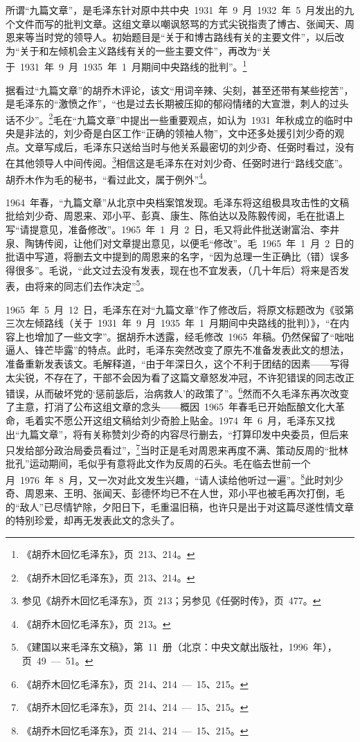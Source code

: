 所谓“九篇文章”，是毛泽东针对原中共中央~1931~年~9~月~1932~年~5~月发出的九个文件而写的批判文章。这组文章以嘲讽怒骂的方式尖锐指责了博古、张闻天、周恩来等当时党的领导人。初始题目是“关于和博古路线有关的主要文件”，以后改为“关于和左倾机会主义路线有关的一些主要文件”，再改为“关于~1931~年~9~月~1935~年~1~月期间中央路线的批判”。\footnote{《胡乔木回忆毛泽东》，页~213、214。}

据看过“九篇文章”的胡乔木评论，该文“用词辛辣、尖刻，甚至还带有某些挖苦”，是毛泽东的“激愤之作”，“也是过去长期被压抑的郁闷情绪的大宣泄，刺人的过头话不少”。\footnote{《胡乔木回忆毛泽东》，页~213、214。}毛在“九篇文章”中提出一些重要观点，如认为~1931~年秋成立的临时中央是非法的，刘少奇是白区工作“正确的领袖人物”，文中还多处援引刘少奇的观点。文章写成后，毛泽东只送给当时与他关系最密切的刘少奇、任弼时看过，没有在其他领导人中间传阅。\footnote{参见《胡乔木回忆毛泽东》，页~213；另参见《任弼时传》，页~477。}相信这是毛泽东在对刘少奇、任弼时进行“路线交底”。胡乔木作为毛的秘书，“看过此文，属于例外”\footnote{《胡乔木回忆毛泽东》，页~213。}。

1964~年春，“九篇文章”从北京中央档案馆发现。毛泽东将这组极具攻击性的文稿批给刘少奇、周恩来、邓小平、彭真、康生、陈伯达以及陈毅传阅，毛在批语上写“请提意见，准备修改”。1965~年~1~月~2~日，毛又将此件批送谢富治、李井泉、陶铸传阅，让他们对文章提出意见，以便毛“修改”。毛~1965~年~1~月~2~日的批语中写道，将删去文中提到的周恩来的名字，“因为总理一生正确比（错）误多得很多”。毛说，“此文过去没有发表，现在也不宜发表，（几十年后）将来是否发表，由将来的同志们去作决定”\footnote{《建国以来毛泽东文稿》，第~11~册（北京：中央文献出版社，1996~年），页~49~—~51。}。

1965~年~5~月~12~日，毛泽东在对“九篇文章”作了修改后，将原文标题改为《驳第三次左倾路线（关于~1931~年~9~月~1935~年~1~月期间中央路线的批判）》，“在内容上也增加了一些文字”。据胡乔木透露，经毛修改~1965~年稿。仍然保留了“咄咄逼人、锋芒毕露”的特点。此时，毛泽东突然改变了原先不准备发表此文的想法，准备重新发表该文。毛解释道，“由于年深日久，这个不利于团结的因素——写得太尖锐，不存在了，干部不会因为看了这篇文章怒发冲冠，不许犯错误的同志改正错误，从而破坏党的‘惩前毖后，治病救人’的政策了”。\footnote{《胡乔木回忆毛泽东》，页~214、214~—~15、215。}然而不久毛泽东再次改变了主意，打消了公布这组文章的念头——概因~1965~年春毛已开始酝酿文化大革命，毛着实不愿公开这组文稿给刘少奇脸上贴金。1974~年~6~月，毛泽东又找出“九篇文章”，将有关称赞刘少奇的内容尽行删去，“打算印发中央委员，但后来只发给部分政治局委员看过”，\footnote{《胡乔木回忆毛泽东》，页~214、214~—~15、215。}当时正是毛对周恩来再度不满、策动反周的“批林批孔”运动期间，毛似乎有意将此文作为反周的石头。毛在临去世前一个月~1976~年~8~月，又一次对此文发生兴趣，“请人读给他听过一遍”。\footnote{《胡乔木回忆毛泽东》，页~214、214~—~15、215。}此时刘少奇、周恩来、王明、张闻天、彭德怀均已不在人世，邓小平也被毛再次打倒，毛的“敌人”已尽情铲除，夕阳日下，毛重温旧稿，也许只是出于对这篇尽遂性情文章的特别珍爱，却再无发表此文的念头了。

